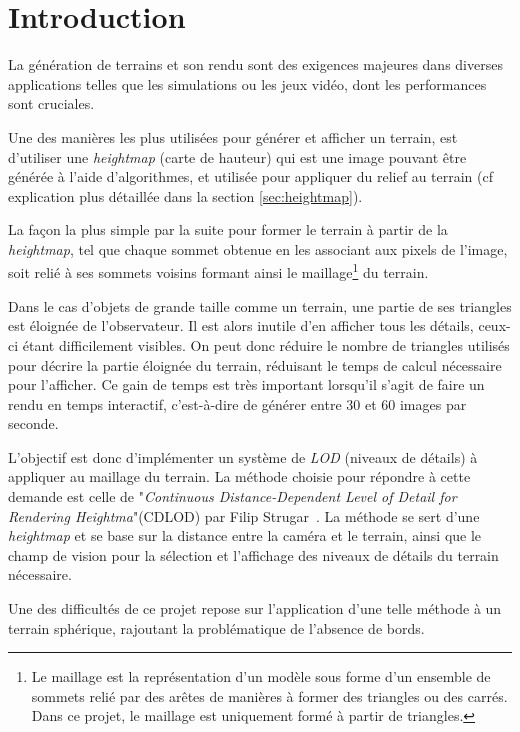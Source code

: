   \chapter*{Introduction}
  \setcounter{chapter}{0}
  
  La génération de terrains et son rendu sont des exigences majeures dans diverses applications telles que les simulations ou les jeux vidéo, dont les performances sont cruciales.
  
  Une des manières les plus utilisées pour générer et afficher un terrain, est d'utiliser une \emph{heightmap} (carte de hauteur) qui est une image pouvant être générée à l'aide d'algorithmes, et utilisée pour appliquer du relief au terrain (cf explication plus détaillée dans la section \ref{sec:heightmap}).
  
  La façon la plus simple par la suite pour former le terrain à partir de la \emph{heightmap}, tel que chaque sommet obtenue en les associant aux pixels de l'image, soit relié à ses sommets voisins formant ainsi le maillage\footnote{Le maillage est la représentation d'un modèle sous forme d'un ensemble de sommets relié par des arêtes de manières à former des triangles ou des carrés. Dans ce projet, le maillage est uniquement formé à partir de triangles.} du terrain.
  
  Dans le cas d'objets de grande taille comme un terrain, une partie de
  ses triangles est éloignée de l'observateur. Il est alors inutile d'en
  afficher tous les détails, ceux-ci étant difficilement visibles. On peut
  donc réduire le nombre de triangles utilisés pour décrire la partie
  éloignée du terrain, réduisant le temps de calcul nécessaire pour
  l'afficher. Ce gain de temps est très important lorsqu'il s'agit de
  faire un rendu en temps interactif, c'est-à-dire de générer entre 30 et
  60 images par seconde.
  
  L'objectif est donc d'implémenter un système de \emph{LOD} (niveaux de détails) à appliquer au maillage du terrain. La méthode choisie pour répondre à cette demande est celle de "\emph{Continuous Distance-Dependent Level of Detail for Rendering Heightma}"(CDLOD) par Filip Strugar~\cite{CDLOD}. La méthode se sert d'une \emph{heightmap} et se base sur la distance entre la caméra et le terrain, ainsi que le champ de vision pour la sélection et l'affichage des niveaux de détails du terrain nécessaire.
  
  Une des difficultés de ce projet repose sur l'application d'une telle méthode à un terrain sphérique, rajoutant la problématique de l'absence de bords.
  